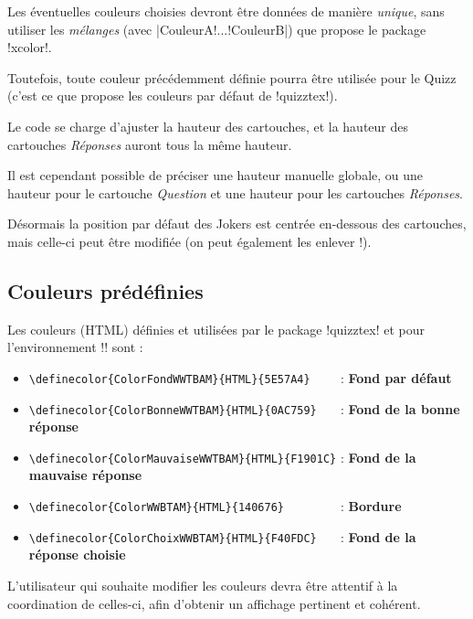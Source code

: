 \documentclass[french,a4paper,11pt]{article}
\newcommand\cmaj[1]{\tcbox[vignetteMaJ]{#1}\xspace}
\begin{document}
\begin{tipblock}
Les éventuelles couleurs choisies devront être données de manière \textit{unique}, sans utiliser les \textit{mélanges} (avec \motcletex|CouleurA!...!CouleurB|) que propose le package \packagetex!xcolor!.

Toutefois, toute couleur précédemment définie pourra être utilisée pour le Quizz (c'est ce que propose les couleurs par défaut de \packagetex!quizztex!).
\end{tipblock}

\begin{importantblock}
Le code se charge d'ajuster la hauteur des cartouches, et la hauteur des cartouches \textit{Réponses} auront tous la même hauteur.

\smallskip

Il est cependant possible de préciser une hauteur manuelle globale, ou une hauteur pour le cartouche \textit{Question} et une hauteur pour les cartouches \textit{Réponses}.

\smallskip

\cmaj{0.1.1} Désormais la position par défaut des \textsf{Jokers} est centrée en-dessous des cartouches, mais celle-ci peut être modifiée (on peut également les enlever !).
\end{importantblock}

\subsection{Couleurs prédéfinies}

\begin{tipblock}
Les couleurs (HTML) définies et utilisées par le package \packagetex!quizztex! et pour l'environnement \motcletex!\QuizzMillions! sont :

\begin{itemize}[leftmargin=*]
	\item \verb!\definecolor{ColorFondWWTBAM}{HTML}{5E57A4}    ! : \textcolor{ColorFondWWTBAM}{\textsf{\textbf{Fond par défaut}}}
	\item \verb!\definecolor{ColorBonneWWTBAM}{HTML}{0AC759}   ! : \textcolor{ColorBonneWWTBAM}{\textsf{\textbf{Fond de la bonne réponse}}}
	\item \verb!\definecolor{ColorMauvaiseWWTBAM}{HTML}{F1901C}! : \textcolor{ColorMauvaiseWWTBAM}{\textsf{\textbf{Fond de la mauvaise réponse}}}
	\item \verb!\definecolor{ColorWWBTAM}{HTML}{140676}        ! : \textcolor{ColorWWBTAM}{\textsf{\textbf{Bordure}}}
	\item \verb!\definecolor{ColorChoixWWBTAM}{HTML}{F40FDC}   ! : \textcolor{ColorChoixWWBTAM}{\textsf{\textbf{Fond de la réponse choisie}}}
\end{itemize}

L'utilisateur qui souhaite modifier les couleurs devra être attentif à la coordination de celles-ci, afin d'obtenir un affichage pertinent et cohérent.
\end{tipblock}
\end{document}
